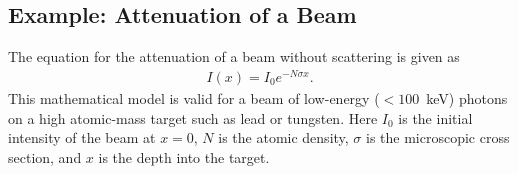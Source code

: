 \subsection{Example: Attenuation of a Beam}

The equation for the attenuation of a beam without scattering is given as
\begin{align}
  I(x) = I_0 e^{-N \sigma x} .
\end{align}
This mathematical model is valid for a beam of low-energy ($< 100$~keV) photons on a high atomic-mass target such as lead or tungsten. Here $I_0$ is the initial intensity of the beam at $x = 0$, $N$ is the atomic density, $\sigma$ is the microscopic cross section, and $x$ is the depth into the target. 

